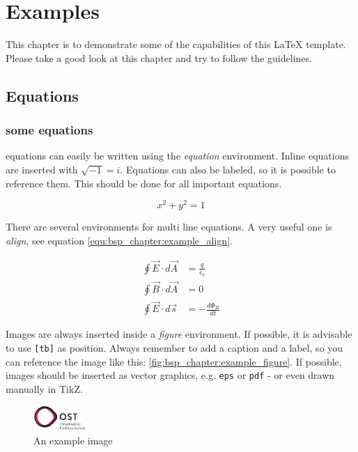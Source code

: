 \chapter{Examples}

This chapter is to demonstrate some of the capabilities of this \LaTeX{} template.
Please take a good look at this chapter and try to follow the guidelines.

\section{Equations}
\subsection{some equations}
%
\glspl{equation} can easily be written using the \emph{\gls{equation}}
environment. Inline equations are inserted with $\sqrt{-1} = i $. Equations can
also be labeled, so it is possible to reference them. This should be done for
all important equations.

\begin{equation}
    x^2 + y^2 = 1
    \label{equ:bsp_chapter:example_equation}
\end{equation}

There are several environments for multi line equations. A very useful one
is \emph{align}, see equation \eqref{equ:bsp_chapter:example_align}.

\begin{align}
    \oint \vec{E} \cdot d \vec{A} &= \frac{q}{\epsilon_0} \\
    \oint \vec{B} \cdot d \vec{A} &= 0 \\
    \oint \vec{E} \cdot d \vec{s} &= - \frac{d \Phi_B}{dt}
    \label{equ:bsp_chapter:example_align}
\end{align}

%
Images are always inserted inside a \emph{figure}
environment. If possible, it is advisable to use \texttt{[tb]} as position.
Always remember to add a caption and a label, so you can reference the image
like this: \autoref{fig:bsp_chapter:example_figure}. If possible, images should be
inserted as vector graphics, e.g. \texttt{eps} or \texttt{pdf} - or even drawn
manually in TikZ.

\begin{figure}[t]
    \centering
    \includegraphics[width=2cm]{header/OSTLogo.png}
    \caption{An example image}
    \label{fig:bsp_chapter:example_figure}
\end{figure}

